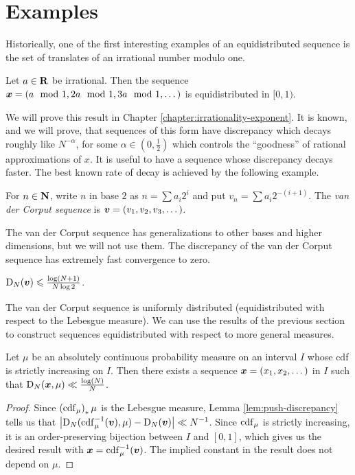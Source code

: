 \section{Examples}

Historically, one of the first interesting examples of an equidistributed 
sequence is the set of translates  of an irrational number modulo one. 

\begin{theorem}
Let $a\in \mathbf{R}$ be irrational. Then the sequence 
${\boldsymbol x}=(a\mod 1,2a\mod 1,3a\mod 1,\dots)$ is equidistributed in $[0,1)$. 
\end{theorem}

We will prove this result in Chapter \ref{chapter:irrationality-exponent}. It 
is known, and we will prove, that 
sequences of this form have discrepancy which decays roughly like 
$N^{-\alpha}$, for some $\alpha\in \left(0,\frac 1 2\right)$ which controls the 
``goodness'' of rational approximations of $x$. It is useful to have a sequence 
whose discrepancy decays faster. The best known rate of decay is achieved by 
the following example. 

\begin{definition}
For $n\in \mathbf{N}$, write $n$ in base $2$ as $n = \sum a_i 2^i$ and put 
$v_n = \sum a_i 2^{-(i+1)}$. The \emph{van der Corput sequence} is 
${\boldsymbol v} = (v_1,v_2,v_3,\dots)$.
\end{definition}

The van der Corput sequence has generalizations to other bases and higher 
dimensions, but we will not use them. The discrepancy of the van der Corput 
sequence has extremely fast convergence to zero. 

\begin{lemma}
$\operatorname{D}_N({\boldsymbol v}) \leqslant \frac{\log(N+1)}{N\log 2}$. 
\end{lemma}

The van der Corput sequence is uniformly distributed (equidistributed with 
respect to the Lebesgue measure). We can use the results of the previous 
section to construct sequences equidistributed with respect to more general 
measures. 

\begin{theorem}\label{thm:van-der-corput}
Let $\mu$ be an absolutely continuous probability measure on an interval $I$  
whose cdf is strictly increasing on $I$. Then there exists a sequence 
${\boldsymbol x}=(x_1,x_2,\dots)$ in $I$ such that $\operatorname{D}_N({\boldsymbol x},\mu) \ll \frac{\log(N)}{N}$. 
\end{theorem}
\begin{proof}
Since $\left(\operatorname{cdf}_\mu\right)_\ast\mu$ is the Lebesgue measure, Lemma 
\ref{lem:push-discrepancy} tells us that 
$\left|\operatorname{D}_N(\operatorname{cdf}_\mu^{-1}({\boldsymbol v}), \mu) - \operatorname{D}_N({\boldsymbol v})\right| \ll N^{-1}$. Since 
$\operatorname{cdf}_\mu$ is strictly increasing, it is an order-preserving bijection between 
$I$ and $[0,1]$, which gives us the desired result with 
${\boldsymbol x} = \operatorname{cdf}_\mu^{-1}({\boldsymbol v})$. The implied constant in the result does not depend 
on $\mu$. 
\end{proof}

